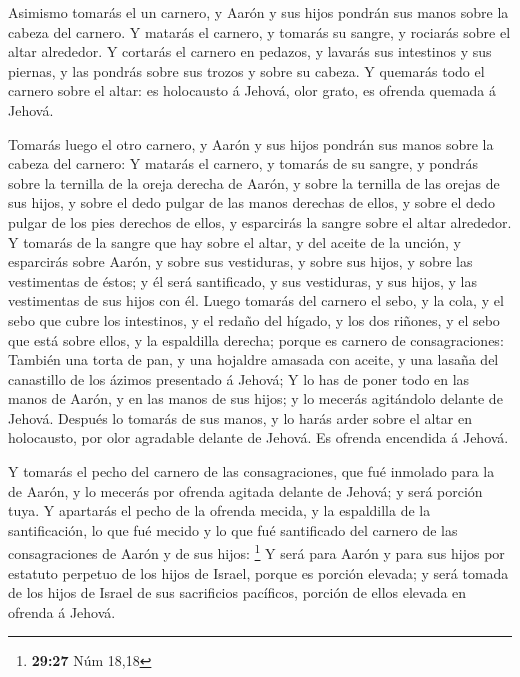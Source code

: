  Asimismo tomarás el un carnero, y Aarón y sus hijos
pondrán sus manos sobre la cabeza del carnero.  Y matarás
el carnero, y tomarás su sangre, y rociarás sobre el altar alrededor.
 Y cortarás el carnero en pedazos, y lavarás sus
intestinos y sus piernas, y las pondrás sobre sus trozos y sobre su
cabeza.  Y quemarás todo el carnero sobre el altar: es
holocausto á Jehová, olor grato, es ofrenda quemada á Jehová.

 Tomarás luego el otro carnero, y Aarón y sus hijos
pondrán sus manos sobre la cabeza del carnero:  Y matarás
el carnero, y tomarás de su sangre, y pondrás sobre la ternilla de la
oreja derecha de Aarón, y sobre la ternilla de las orejas de sus hijos,
y sobre el dedo pulgar de las manos derechas de ellos, y sobre el dedo
pulgar de los pies derechos de ellos, y esparcirás la sangre sobre el
altar alrededor.  Y tomarás de la sangre que hay sobre el
altar, y del aceite de la unción, y esparcirás sobre Aarón, y sobre sus
vestiduras, y sobre sus hijos, y sobre las vestimentas de éstos; y él
será santificado, y sus vestiduras, y sus hijos, y las vestimentas de
sus hijos con él.  Luego tomarás del carnero el sebo, y
la cola, y el sebo que cubre los intestinos, y el redaño del hígado, y
los dos riñones, y el sebo que está sobre ellos, y la espaldilla
derecha; porque es carnero de consagraciones:  También
una torta de pan, y una hojaldre amasada con aceite, y una lasaña del
canastillo de los ázimos presentado á Jehová;  Y lo has
de poner todo en las manos de Aarón, y en las manos de sus hijos; y lo
mecerás agitándolo delante de Jehová.  Después lo tomarás
de sus manos, y lo harás arder sobre el altar en holocausto, por olor
agradable delante de Jehová. Es ofrenda encendida á Jehová.

 Y tomarás el pecho del carnero de las consagraciones,
que fué inmolado para la de Aarón, y lo mecerás por ofrenda agitada
delante de Jehová; y será porción tuya.  Y apartarás el
pecho de la ofrenda mecida, y la espaldilla de la santificación, lo que
fué mecido y lo que fué santificado del carnero de las consagraciones de
Aarón y de sus hijos: \footnote{\textbf{29:27} Núm 18,18}
 Y será para Aarón y para sus hijos por estatuto perpetuo
de los hijos de Israel, porque es porción elevada; y será tomada de los
hijos de Israel de sus sacrificios pacíficos, porción de ellos elevada
en ofrenda á Jehová.

